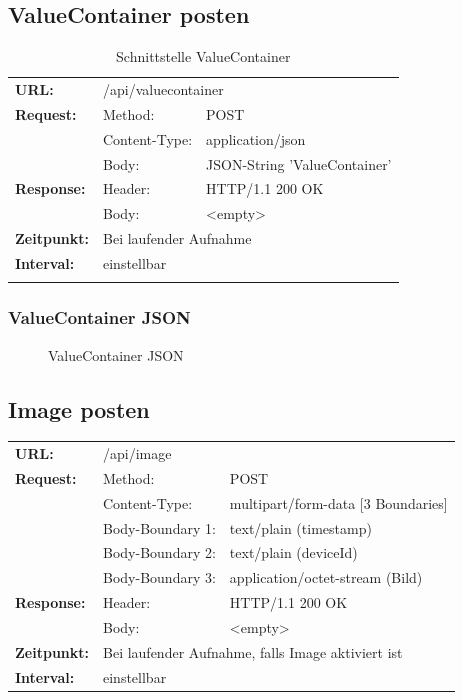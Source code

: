 \subsection{ValueContainer posten}
\begin{longtable}{ p{2.5cm} p{3.5cm} p{6cm}}
	\textbf{URL:} & \multicolumn{2}{p{10cm}}{/api/valuecontainer} \\
	\textbf{Request:} & Method: & POST \\
		& Content-Type: & application/json \\
		& Body: & JSON-String 'ValueContainer'\\
	\textbf{Response:} & Header: & HTTP/1.1 200 OK \\
		& Body: & <empty> \\
	\textbf{Zeitpunkt:} & \multicolumn{2}{p{10cm}}{Bei laufender Aufnahme} \\ 
	\textbf{Interval:} & \multicolumn{2}{p{10cm}}{einstellbar} \\ 
	\caption{Schnittstelle ValueContainer}
\end{longtable}

\subsubsection{ValueContainer JSON}
\begin{figure}[H]
	\centering
	
	\caption{ValueContainer JSON}
	\label{fig:valuecontainer}
\end{figure}

\subsection{Image posten}
\begin{longtable}{ p{2.5cm} p{3.5cm} p{6cm}}
	\textbf{URL:} & \multicolumn{2}{p{10cm}}{/api/image} \\
	\textbf{Request:} & Method: & POST \\
		& Content-Type: & multipart/form-data [3 Boundaries] \\
		& Body-Boundary 1: & text/plain (timestamp) \\
		& Body-Boundary 2: & text/plain (deviceId) \\
		& Body-Boundary 3: & application/octet-stream (Bild) \\
	\textbf{Response:} & Header: & HTTP/1.1 200 OK \\
		& Body: & <empty> \\
	\textbf{Zeitpunkt:} & \multicolumn{2}{p{10cm}}{Bei laufender Aufnahme, falls Image aktiviert ist} \\ 
	\textbf{Interval:} & \multicolumn{2}{p{10cm}}{einstellbar}
\end{longtable}

